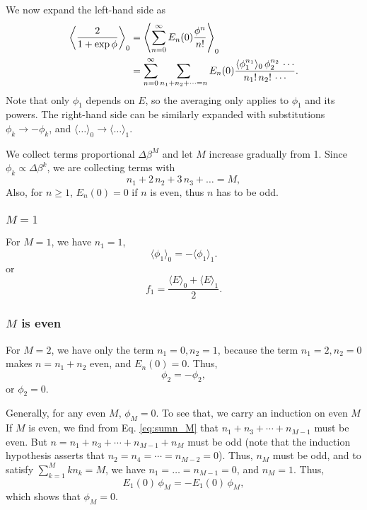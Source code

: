 \documentclass[aip,jcp,preprint,notitlepage, superscriptaddress]{revtex4-1}
\begin{document}
We now expand the left-hand side as
%
\begin{align*}
\left\langle
  \frac{ 2 }
  { 1 + \exp \phi  }
\right\rangle_0
&=
\left\langle
\sum_{n = 0}^\infty
E_n(0) \frac{ \phi^n } { n! }
\right\rangle_0
\notag \\
&=
\sum_{n = 0}^\infty
\sum_{n_1 + n_2 + \dots = n}
E_n(0)
\frac{ \langle \phi_1^{n_1} \rangle_0 \,
      \phi_2^{n_2} \, \cdots } { n_1! \, n_2! \, \cdots }.
\end{align*}
%
Note that only $\phi_1$ depends on $E$,
so the averaging only applies to $\phi_1$ and its powers.
%
The right-hand side
can be similarly expanded
with substitutions
$\phi_k \rightarrow -\phi_k$,
and
$\langle \dots \rangle_0 \rightarrow \langle \dots \rangle_1$.



We collect terms proportional $\Delta \beta^M$
and let $M$ increase gradually from 1.
%
Since $\phi_k \propto \Delta \beta^k$,
we are collecting terms with
\begin{equation}
n_1 + 2 \, n_2 + 3 \, n_3 + \dots = M,
\label{eq:sumn_M}
\end{equation}
Also,
for $n \ge 1$,
$E_n(0) = 0$ if $n$ is even,
thus $n$ has to be odd.



\subsubsection{$M = 1$}



For $M = 1$,
we have $n_1 = 1$,
\[
\langle \phi_1 \rangle_0
=
-\langle \phi_1 \rangle_1.
\]
or
\[
f_1 =
\frac{
  \langle E \rangle_0
  +
  \langle E \rangle_1
}{ 2 }.
\]



\subsubsection{$M$ is even}



For $M = 2$,
we have only the term $n_1 = 0, n_2 = 1$,
because the term $n_1 = 2, n_2 = 0$
makes $n = n_1 + n_2$ even,
and $E_n(0) = 0$.
%
Thus,
\[
\phi_2
=
-\phi_2,
\]
or $\phi_2 = 0$.



Generally,
for any even $M$,
$\phi_M = 0$.
%
To see that, we carry an induction on even $M$
%
If $M$ is even,
we find from Eq. \eqref{eq:sumn_M} that
$n_1 + n_3 + \cdots + n_{M - 1}$ must be even.
But
$n = n_1 + n_3 + \cdots + n_{M - 1} + n_M$
must be odd
(note that the induction hypothesis asserts
that $n_2 = n_4 = \cdots = n_{M-2} = 0$).
%
Thus, $n_M$ must be odd,
and to satisfy $\sum_{k = 1}^M k n_k = M$,
we have $n_1 = \dots = n_{M-1} = 0$,
and $n_M = 1$.
%
Thus,
%
\[
E_1(0) \, \phi_M
=
-E_1(0) \, \phi_M,
\]
which shows that $\phi_M = 0$.
\end{document}
